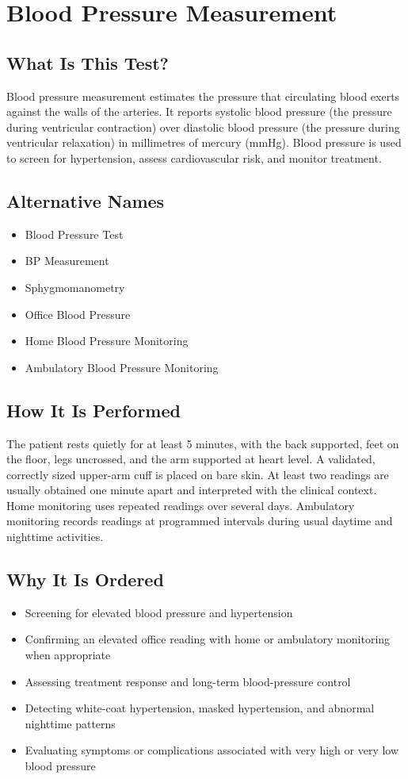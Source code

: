 \chapter{Blood Pressure Measurement}

\section*{What Is This Test?}
Blood pressure measurement estimates the pressure that circulating blood exerts against the walls of the arteries. It reports systolic blood pressure (the pressure during ventricular contraction) over diastolic blood pressure (the pressure during ventricular relaxation) in millimetres of mercury (mmHg). Blood pressure is used to screen for hypertension, assess cardiovascular risk, and monitor treatment.

\section*{Alternative Names}
\begin{itemize}
  \item Blood Pressure Test
  \item BP Measurement
  \item Sphygmomanometry
  \item Office Blood Pressure
  \item Home Blood Pressure Monitoring
  \item Ambulatory Blood Pressure Monitoring
\end{itemize}
\section*{How It Is Performed}
The patient rests quietly for at least 5 minutes, with the back supported, feet on the floor, legs uncrossed, and the arm supported at heart level. A validated, correctly sized upper-arm cuff is placed on bare skin. At least two readings are usually obtained one minute apart and interpreted with the clinical context. Home monitoring uses repeated readings over several days. Ambulatory monitoring records readings at programmed intervals during usual daytime and nighttime activities.

\section*{Why It Is Ordered}
\begin{itemize}
  \item Screening for elevated blood pressure and hypertension
  \item Confirming an elevated office reading with home or ambulatory monitoring when appropriate
  \item Assessing treatment response and long-term blood-pressure control
  \item Detecting white-coat hypertension, masked hypertension, and abnormal nighttime patterns
  \item Evaluating symptoms or complications associated with very high or very low blood pressure
\end{itemize}

